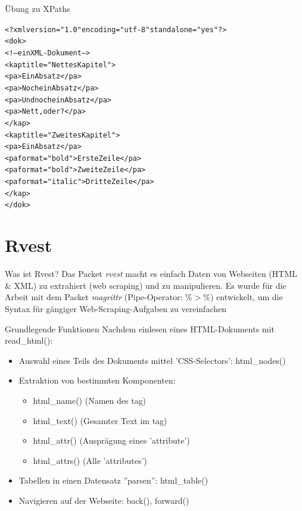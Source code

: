 \documentclass[xcolor=dvipsnames]{beamer}\usepackage[]{graphicx}\usepackage[]{color}
\makeatletter
\newcommand{\hlstr}[1]{\textcolor[rgb]{0.192,0.494,0.8}{#1}}%
\newenvironment{kframe}{%
 \def\at@end@of@kframe{}%
 \ifinner\ifhmode%
  \def\at@end@of@kframe{\end{minipage}}%
  \begin{minipage}{\columnwidth}%
 \fi\fi%
 \def\FrameCommand##1{\hskip\@totalleftmargin \hskip-\fboxsep
 \colorbox{shadecolor}{##1}\hskip-\fboxsep
     \hskip-\linewidth \hskip-\@totalleftmargin \hskip\columnwidth}%
 \MakeFramed {\advance\hsize-\width
   \@totalleftmargin\z@ \linewidth\hsize
   \@setminipage}}%
 {\par\unskip\endMakeFramed%
 \at@end@of@kframe}
\makeatother
\begin{document}
\begin{frame}[fragile]{Übung zu XPaths}
\begin{kframe}
\begin{alltt}
<?xml version=\hlstr{"1.0"} encoding=\hlstr{"utf-8"} standalone=\hlstr{"yes"} ?>
<dok>
    <!-- ein XML-Dokument -->
    <kap title=\hlstr{"Nettes Kapitel"}>
        <pa>Ein Absatz</pa>
        <pa>Noch ein Absatz</pa>
        <pa>Und noch ein Absatz</pa>
        <pa>Nett, oder?</pa>
    </kap>
    <kap title=\hlstr{"Zweites Kapitel"}>
        <pa>Ein Absatz</pa>
        <pa format=\hlstr{"bold"}>Erste Zeile</pa>
        <pa format=\hlstr{"bold"}>Zweite Zeile</pa>
        <pa format=\hlstr{"italic"}>Dritte Zeile</pa>
    </kap>
</dok>
\end{alltt}
\end{kframe}
\end{frame}



\section{Rvest} %


\begin{frame}{Was ist Rvest?}
Das Packet \textit{rvest} macht es einfach Daten von Webseiten (HTML \& XML) zu extrahiert (web scraping) und zu manipulieren. Es wurde für die Arbeit mit dem Packet \textit{magrittr} (Pipe-Operator: \%$>$\%) entwickelt, um die Syntax für gängiger Web-Scraping-Aufgaben zu vereinfachen
\end{frame}


\begin{frame}{Grundlegende Funktionen}
Nachdem einlesen eines HTML-Dokuments mit read\_html():
  \begin{itemize}
  \item Auswahl eines Teils des Dokuments mittel 'CSS-Selectors': html\_nodes() 
  \item Extraktion von bestimmten Komponenten:
    \begin{itemize}
      \item html\_name() (Namen des tag)
      \item html\_text() (Gesamter Text im tag)
      \item html\_attr() (Ausprägung eines 'attribute')
      \item html\_attrs() (Alle 'attributes')
    \end{itemize}
  \item Tabellen in einen Datensatz ''parsen'': html\_table()
  \item Navigieren auf der Webseite: back(), forward()
  \end{itemize}
\end{frame}
\end{document}
